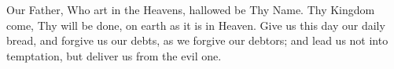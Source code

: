 Our Father, Who art in the Heavens, hallowed be Thy Name. Thy Kingdom come, Thy will be done, on earth as it is in Heaven. Give us this day our daily bread, and forgive us our debts, as we forgive our debtors; and lead us not into temptation, but deliver us from the evil one. 
